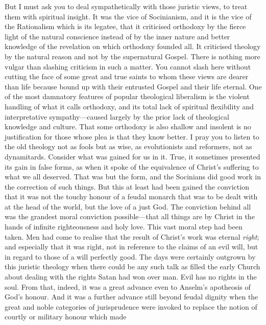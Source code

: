 \documentclass[12pt,letterpaper,oneside]{book}
\begin{document}
But I must ask you to deal sympathetically 
with those juristic views, to treat them with 
spiritual insight. It was the vice of Socinianism, 
and it is the vice of the Rationalism which is its 
legatee, that it criticised orthodoxy by the fierce 
light of the natural conscience instead of by the 
inner nature and better knowledge of the revelation 
on which orthodoxy founded all. It criticised 
theology by the natural reason and not by 
the supernatural Gospel. There is nothing more 
vulgar than slashing criticism in such a matter. 
You cannot slash here without cutting the face 
of some great and true saints to whom these 
views are dearer than life because bound up 
with their entrusted Gospel and their life 
eternal. One of the most damnatory features 
of popular theological liberalism is the violent 
handling of what it calls orthodoxy, and its 
total lack of spiritual flexibility and interpretative 
sympathy---caused largely by the prior 
lack of theological knowledge and culture. 
That some orthodoxy is also shallow and insolent 
is no justification for those whose plea 
is that they know better. I pray you to listen 
to the old theology not as fools but as wise, 
as evolutionists and reformers, not as dynamitards. 
Consider what was gained for us in 
it. True, it sometimes presented its gain in 
false forms, as when it spoke of the equivalence 
of Christ's suffering to what we all deserved. 
That was but the form, and the Socinians did good 
work in the correction of such things. But this 
at least had been gained the conviction that it 
was not the touchy honour of a feudal monarch 
that was to be dealt with at the head of the 
world, but the love of a just God. The conviction 
behind all was the grandest moral conviction 
possible---that all things are by Christ in the 
hands of infinite righteousness and holy love. 
This vast moral step had been taken. Men had 
come to realise that the result of Christ's work 
was eternal \textit{right}; and especially that it was 
right, not in reference to the claims of an evil 
will, but in regard to those of a will perfectly 
good. The days were certainly outgrown by this 
juristic theology when there could be any such 
talk as filled the early Church about dealing 
with the rights Satan had won over man. 
Evil has no rights in the soul. From that, indeed, 
it was a great advance even to Anselm's 
apotheosis of God's honour. And it was a 
further advance still beyond feudal dignity 
when the great and noble categories of jurisprudence 
were invoked to replace the notion 
of courtly or military honour which made 
\end{document}
